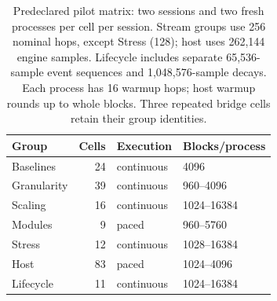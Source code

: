 \begin{table}[htbp]
\centering\small
\begin{tabular}{@{}lrll@{}}
\toprule
Group & Cells & Execution & Blocks/process \\
\midrule
Baselines & 24 & continuous & 4096 \\
Granularity & 39 & continuous & 960--4096 \\
Scaling & 16 & continuous & 1024--16384 \\
Modules & 9 & paced & 960--5760 \\
Stress & 12 & continuous & 1028--16384 \\
Host & 83 & paced & 1024--4096 \\
Lifecycle & 11 & continuous & 1024--16384 \\
\bottomrule
\end{tabular}
\caption{Predeclared pilot matrix: two sessions and two fresh processes per cell per session. Stream groups use 256 nominal hops, except Stress (128); host uses 262,144 engine samples. Lifecycle includes separate 65,536-sample event sequences and 1,048,576-sample decays. Each process has 16 warmup hops; host warmup rounds up to whole blocks. Three repeated bridge cells retain their group identities.}
\label{tab:study-design}
\end{table}
